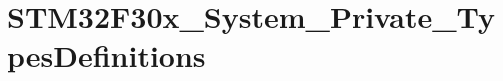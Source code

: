 \hypertarget{group___s_t_m32_f30x___system___private___types_definitions}{\section{S\-T\-M32\-F30x\-\_\-\-System\-\_\-\-Private\-\_\-\-Types\-Definitions}
\label{group___s_t_m32_f30x___system___private___types_definitions}
}

